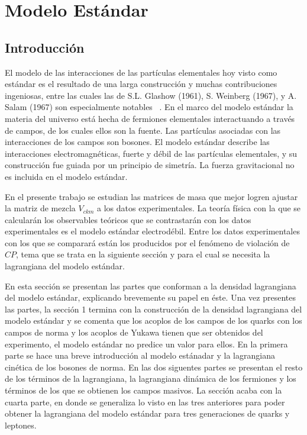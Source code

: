 {\chapter{Modelo Est\'andar}}
\section{Introducci\'on}
El modelo de las interacciones de las part\'iculas elementales hoy visto como 
est\'andar es el resultado de una larga construcci\'on y muchas contribuciones 
ingeniosas, entre las cuales las de  S.L. Glashow (1961), S. Weinberg (1967), y 
A. Salam (1967) son especialmente notables ~\cite{Giu200701}. En el marco del 
modelo est\'andar la materia del universo est\'a hecha de fermiones elementales 
interactuando a trav\'es de campos, de los cuales ellos son la fuente. Las 
part\'iculas asociadas con las interacciones de los campos son bosones. El 
modelo est\'andar describe las interacciones electromagn\'eticas, fuerte y 
d\'ebil de las part\'iculas elementales, y su construcci\'on fue guiada por un 
principio de simetr\'ia. La fuerza gravitacional no es incluida en el modelo
est\'andar.

En el presente trabajo se estudian las matrices de masa que mejor logren ajustar
la matriz de mezcla $V_{ckm}$ a los datos experimentales. La teor\'ia f\'isica
con la que se calcular\'an los observables te\'oricos que se contrastar\'an con 
los datos experimentales es el modelo est\'andar electrod\'ebil. Entre los datos
experimentales con los que se comparar\'a est\'an los producidos por el 
fen\'omeno de violaci\'on de $CP$, tema que se trata en la siguiente secci\'on y
para el cual se necesita la lagrangiana del modelo est\'andar. 

En esta secci\'on se presentan las partes que conforman a la densidad 
lagrangiana del modelo est\'andar, explicando brevemente su papel en \'este. Una
vez presentes las partes, la secci\'on 1 termina con la construcci\'on de la
densidad lagrangiana del modelo est\'andar y se comenta que los acoplos de los
campos de los quarks con los campos de norma y los acoplos de Yukawa tienen que
ser obtenidos del experimento, el modelo est\'andar no predice un valor para
ellos. En la primera
parte se hace una breve introducci\'on al modelo est\'anadar y la lagrangiana 
cin\'etica de los bosones de norma. En las dos siguentes partes se presentan el
resto de los t\'erminos de la lagrangiana, la lagrangiana din\'amica de los
fermiones y los t\'erminos de los que se obtienen los campos masivos. La
secci\'on acaba con la cuarta parte, en donde se generaliza lo visto en las tres
anteriores para poder obtener la lagrangiana del modelo est\'andar para tres
generaciones de quarks y leptones. 

